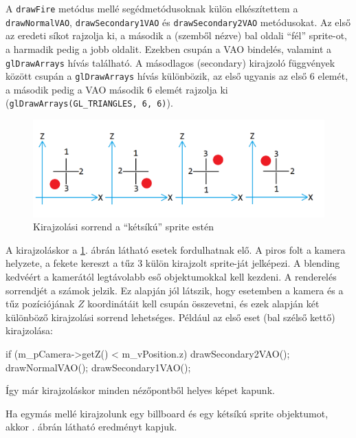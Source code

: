 A \texttt{drawFire} metódus mellé segédmetódusoknak külön elkészítettem a \texttt{drawNormalVAO}, \texttt{drawSecondary1VAO} és \texttt{drawSecondary2VAO} metódusokat. Az első az eredeti síkot rajzolja ki, a második a (szemből nézve) bal oldali ``fél'' sprite-ot, a harmadik pedig a jobb oldalit. Ezekben csupán a VAO bindelés, valamint a \texttt{glDrawArrays} hívás található. A másodlagos (secondary) kirajzoló függvények között csupán a \texttt{glDrawArrays} hívás különbözik, az első ugyanis az első 6 elemét, a második pedig a VAO második 6 elemét rajzolja ki (\texttt{glDrawArrays(GL\_TRIANGLES, 6, 6)}). 

\begin{figure}[h]
 \centering
 \includegraphics[width=\textwidth]{kepek/billboardSorting.png}
 \caption{Kirajzolási sorrend a ``kétsíkú'' sprite estén}
 \label{fig:spriteSorting}
\end{figure}
A kirajzoláskor a \ref{fig:spriteSorting}. ábrán látható esetek fordulhatnak elő. A piros folt a kamera helyzete, a fekete kereszt a tűz 3 külön kirajzolt sprite-ját jelképezi. A blending kedvéért a kamerától legtávolabb eső objektumokkal kell kezdeni. A renderelés sorrendjét a számok jelzik. Ez alapján jól látszik, hogy esetemben a kamera és a tűz pozíciójának $Z$ koordinátáit kell csupán összevetni, és ezek alapján két különböző kirajzolási sorrend lehetséges. 
Például az első eset (bal szélső kettő) kirajzolása: 
\begin{cpp}
if (m_pCamera->getZ() < m_vPosition.z)
{
	drawSecondary2VAO();
	drawNormalVAO();
	drawSecondary1VAO();
}
\end{cpp}
Így már kirajzoláskor minden nézőpontből helyes képet kapunk.

Ha egymás mellé kirajzolunk egy billboard és egy kétsíkú sprite objektumot, akkor . ábrán látható eredményt kapjuk.

